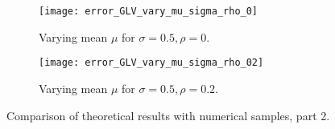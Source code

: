 \documentclass[10pt]{article}
\begin{document}
\begin{figure}[tb]
    \begin{subfigure}{.47\textwidth}
      \centering
        \texttt{[image: error\_GLV\_vary\_mu\_sigma\_rho\_0]}
        \caption{ 
        Varying mean $\mu$ for $\sigma = 0.5, \rho = 0$.
        }
        \label{fig:vary_mu_sigma_rho_0}
    \end{subfigure}%
    \begin{subfigure}{.47\textwidth}
      \centering
        \texttt{[image: error\_GLV\_vary\_mu\_sigma\_rho\_02]}
        \caption{ 
        Varying mean $\mu$ for $\sigma = 0.5, \rho = 0.2$.
        }
        \label{fig:vary_mu_sigma_rho_02}
    \end{subfigure}%

    \caption{Comparison of theoretical results with numerical samples, part 2.
}
    \label{fig:comparison}
\end{figure}




\pagestyle{empty}

\end{document}
